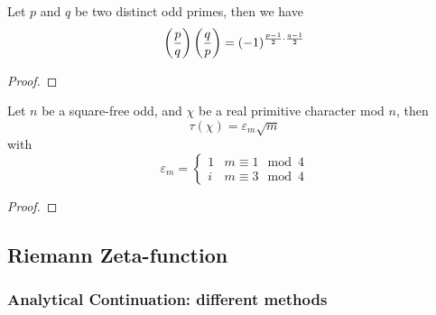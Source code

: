 \begin{colortheorem}
    Let \(p\) and \(q\) be two distinct odd primes, then we have
    \[\left(\frac{p}{q}\right) \left(\frac{q}{p}\right) = (-1)^{\frac{p-1}{2}\cdot \frac{q-1}{2}}\]
\end{colortheorem}
\begin{proof}
    
\end{proof}

\begin{colortheorem}
    Let \(n\) be a square-free odd, and \(\chi\) be a real primitive character mod \(n\), then 
    \[\tau(\chi) = \varepsilon_m \sqrt{m}\]
    with
    \[\varepsilon_m = \begin{cases}
        1 & m \equiv 1 \mod 4 \\
        i & m \equiv 3 \mod 4
    \end{cases}\]
\end{colortheorem}
\begin{proof}
    
\end{proof}

\subsection{Riemann Zeta-function}

\subsubsection{Analytical Continuation: different methods}

